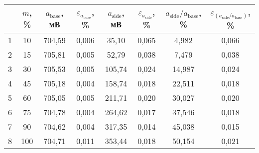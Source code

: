 \begin{table}
\centering
\label{tbl:7}
\begin{tabular}{|c|c|c|c|c|c|c|c|}
\hline
 & $m$, \% & $a_{\mathrm{base}}$, мВ & $\varepsilon_{a_{\mathrm{base}}}$, \% & $a_{\mathrm{side}}$, мВ & $\varepsilon_{a_{\mathrm{side}}}$, \% & $a_{\mathrm{side}} / a_{\mathrm{base}}$, \% & $\varepsilon_{(a_{\mathrm{side}} / a_{\mathrm{base}})}$, \% \\
\hline
1 & 10 & 704,59 & 0,006 & 35,10 & 0,065 & 4,982 & 0,066 \\
\cline{1-8}
2 & 15 & 705,81 & 0,005 & 52,79 & 0,038 & 7,479 & 0,038 \\
\cline{1-8}
3 & 30 & 705,53 & 0,005 & 105,74 & 0,024 & 14,987 & 0,024 \\
\cline{1-8}
4 & 45 & 705,18 & 0,004 & 158,74 & 0,018 & 22,511 & 0,018 \\
\cline{1-8}
5 & 60 & 705,05 & 0,005 & 211,71 & 0,020 & 30,027 & 0,020 \\
\cline{1-8}
6 & 75 & 704,78 & 0,004 & 264,62 & 0,017 & 37,546 & 0,018 \\
\cline{1-8}
7 & 90 & 704,62 & 0,004 & 317,35 & 0,014 & 45,038 & 0,015 \\
\cline{1-8}
8 & 100 & 704,71 & 0,011 & 353,44 & 0,018 & 50,154 & 0,021 \\
\cline{1-8}
\hline
\end{tabular}
\end{table}


